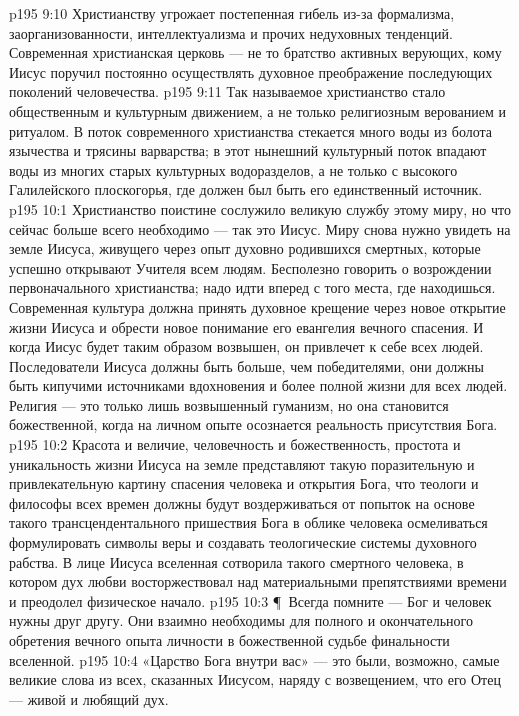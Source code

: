 \vs p195 9:10 Христианству угрожает постепенная гибель из\hyp{}за формализма, заорганизованности, интеллектуализма и прочих недуховных тенденций. Современная христианская церковь --- не то братство активных верующих, кому Иисус поручил постоянно осуществлять духовное преображение последующих поколений человечества.
\vs p195 9:11 Так называемое христианство стало общественным и культурным движением, а не только религиозным верованием и ритуалом. В поток современного христианства стекается много воды из болота язычества и трясины варварства; в этот нынешний культурный поток впадают воды из многих старых культурных водоразделов, а не только с высокого Галилейского плоскогорья, где должен был быть его единственный источник.
\vs p195 10:1 Христианство поистине сослужило великую службу этому миру, но что сейчас больше всего необходимо --- так это Иисус. Миру снова нужно увидеть на земле Иисуса, живущего через опыт духовно родившихся смертных, которые успешно открывают Учителя всем людям. Бесполезно говорить о возрождении первоначального христианства; надо идти вперед с того места, где находишься. Современная культура должна принять духовное крещение через новое открытие жизни Иисуса и обрести новое понимание его евангелия вечного спасения. И когда Иисус будет таким образом возвышен, он привлечет к себе всех людей. Последователи Иисуса должны быть больше, чем победителями, они должны быть кипучими источниками вдохновения и более полной жизни для всех людей. Религия --- это только лишь возвышенный гуманизм, но она становится божественной, когда на личном опыте осознается реальность присутствия Бога.
\vs p195 10:2 Красота и величие, человечность и божественность, простота и уникальность жизни Иисуса на земле представляют такую поразительную и привлекательную картину спасения человека и открытия Бога, что теологи и философы всех времен должны будут воздерживаться от попыток на основе такого трансцендентального пришествия Бога в облике человека осмеливаться формулировать символы веры и создавать теологические системы духовного рабства. В лице Иисуса вселенная сотворила такого смертного человека, в котором дух любви восторжествовал над материальными препятствиями времени и преодолел физическое начало.
\vs p195 10:3 \P\ Всегда помните --- Бог и человек нужны друг другу. Они взаимно необходимы для полного и окончательного обретения вечного опыта личности в божественной судьбе финальности вселенной.
\vs p195 10:4 «Царство Бога внутри вас» --- это были, возможно, самые великие слова из всех, сказанных Иисусом, наряду с возвещением, что его Отец --- живой и любящий дух.
